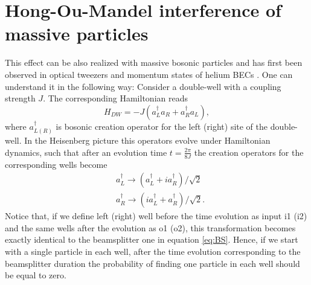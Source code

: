 \section{Hong-Ou-Mandel interference of massive particles}
This effect can be also realized with massive bosonic particles and has first been observed in optical tweezers \cite{Kaufman2014} and momentum states of helium BECs \cite{Lopes2015}. One can understand it in the following way: Consider a double-well with a coupling strength $J$. The corresponding Hamiltonian reads 
\begin{equation}
H_{DW} = -J(a^{\dagger}_L a_R + a^{\dagger}_R a_L),
\end{equation}
where $a^{\dagger}_{L(R)}$ is bosonic creation operator for the left (right) site of the double-well. In the Heisenberg picture this operators evolve under Hamiltonian dynamics, such that after an evolution time $t= \frac{2 \pi}{8J}$ the creation operators for the corresponding wells become
\begin{equation}
\begin{aligned}
& a_{L}^{\dagger} \rightarrow (a_{L}^{\dagger} +ia_{R}^{\dagger} )/\sqrt{2} \\
& a_{R}^{\dagger} \rightarrow (ia_{L}^{\dagger} +a_{R}^{\dagger} )/\sqrt{2}.
\end{aligned}
\end{equation}
Notice that, if we define left (right) well before the time evolution as input i1 (i2) and the same wells after the evolution as o1 (o2), this transformation becomes exactly identical to the beamsplitter one in equation \ref{eq:BS}. Hence, if we start with a single particle in each well, after the time evolution corresponding to the beamsplitter duration the probability of finding one particle in each well should be equal to zero. 

